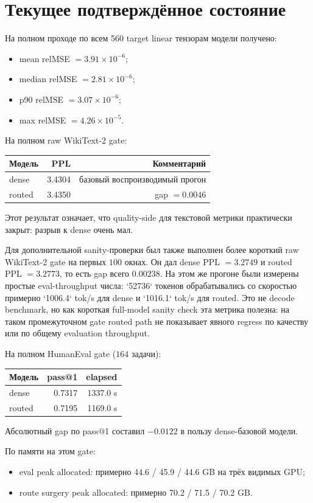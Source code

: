 \section{Текущее подтверждённое состояние}

На полном проходе по всем 560 target linear тензорам модели получено:

\begin{itemize}[leftmargin=1.5em]
\item mean relMSE $= 3.91 \times 10^{-6}$;
\item median relMSE $= 2.81 \times 10^{-6}$;
\item p90 relMSE $= 3.07 \times 10^{-6}$;
\item max relMSE $= 4.26 \times 10^{-5}$.
\end{itemize}

На полном raw WikiText-2 gate:

\begin{center}
\begin{tabular}{lrr}
\toprule
Модель & PPL & Комментарий \\
\midrule
dense & 3.4304 & базовый воспроизводимый прогон \\
routed & 3.4350 & gap $= 0.0046$ \\
\bottomrule
\end{tabular}
\end{center}

Этот результат означает, что quality-side для текстовой метрики практически
закрыт: разрыв к dense очень мал.

Для дополнительной sanity-проверки был также выполнен более короткий raw
WikiText-2 gate на первых $100$ окнах. Он дал dense PPL $= 3.2749$ и routed
PPL $= 3.2773$, то есть gap всего $0.00238$. На этом же прогоне были измерены
простые eval-throughput числа: `52736` токенов обрабатывались со скоростью
примерно `1006.4` tok/s для dense и `1016.1` tok/s для routed. Это не decode
benchmark, но как короткая full-model sanity check эта метрика полезна: на
таком промежуточном gate routed path не показывает явного regress по качеству
или по общему evaluation throughput.

На полном HumanEval gate ($164$ задачи):

\begin{center}
\begin{tabular}{lrr}
\toprule
Модель & pass@1 & elapsed \\
\midrule
dense & 0.7317 & 1337.0 s \\
routed & 0.7195 & 1169.0 s \\
\bottomrule
\end{tabular}
\end{center}

Абсолютный gap по pass@1 составил $-0.0122$ в пользу dense-базовой модели.

По памяти на этом gate:

\begin{itemize}[leftmargin=1.5em]
\item eval peak allocated: примерно 44.6 / 45.9 / 44.6 GB на трёх видимых GPU;
\item route surgery peak allocated: примерно 70.2 / 71.5 / 70.2 GB.
\end{itemize}